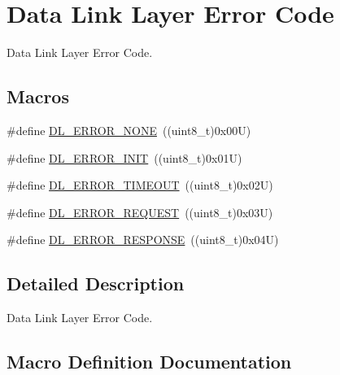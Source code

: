 \hypertarget{group___d_l___error___code}{}\section{Data Link Layer Error Code}
\label{group___d_l___error___code}


Data Link Layer Error Code.  


\subsection*{Macros}
\begin{DoxyCompactItemize}
\item 
\#define \hyperlink{group___d_l___error___code_ga0916a814c19b6fef4ca1a90731bf5d01}{D\+L\+\_\+\+E\+R\+R\+O\+R\+\_\+\+N\+O\+NE}~((uint8\+\_\+t)0x00\+U)
\item 
\#define \hyperlink{group___d_l___error___code_ga1cc60f560e52266c38bdd49e2748d498}{D\+L\+\_\+\+E\+R\+R\+O\+R\+\_\+\+I\+N\+IT}~((uint8\+\_\+t)0x01\+U)
\item 
\#define \hyperlink{group___d_l___error___code_gaa75de5faaf914c3a1217429c157c8be7}{D\+L\+\_\+\+E\+R\+R\+O\+R\+\_\+\+T\+I\+M\+E\+O\+UT}~((uint8\+\_\+t)0x02\+U)
\item 
\#define \hyperlink{group___d_l___error___code_gabad6a7bb56b201b473c7dd9c5eeec0b8}{D\+L\+\_\+\+E\+R\+R\+O\+R\+\_\+\+R\+E\+Q\+U\+E\+ST}~((uint8\+\_\+t)0x03\+U)
\item 
\#define \hyperlink{group___d_l___error___code_ga8e9c3a3595a98bbc1d3a46262a93303b}{D\+L\+\_\+\+E\+R\+R\+O\+R\+\_\+\+R\+E\+S\+P\+O\+N\+SE}~((uint8\+\_\+t)0x04\+U)
\end{DoxyCompactItemize}


\subsection{Detailed Description}
Data Link Layer Error Code. 



\subsection{Macro Definition Documentation}
